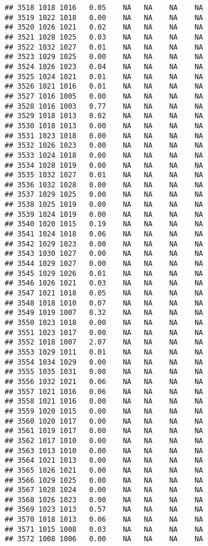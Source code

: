\documentclass{article}\usepackage{graphicx, color}
\makeatletter
\newenvironment{kframe}{%
 \def\at@end@of@kframe{}%
 \ifinner\ifhmode%
  \def\at@end@of@kframe{\end{minipage}}%
  \begin{minipage}{\columnwidth}%
 \fi\fi%
 \def\FrameCommand##1{\hskip\@totalleftmargin \hskip-\fboxsep
 \colorbox{shadecolor}{##1}\hskip-\fboxsep
     \hskip-\linewidth \hskip-\@totalleftmargin \hskip\columnwidth}%
 \MakeFramed {\advance\hsize-\width
   \@totalleftmargin\z@ \linewidth\hsize
   \@setminipage}}%
 {\par\unskip\endMakeFramed%
 \at@end@of@kframe}
\newenvironment{knitrout}{}{} %
\makeatother
\begin{document}
\begin{knitrout}
\begin{kframe}
\begin{verbatim}
## 3518 1018 1016   0.05    NA   NA    NA    NA
## 3519 1022 1018   0.00    NA   NA    NA    NA
## 3520 1026 1021   0.02    NA   NA    NA    NA
## 3521 1028 1025   0.03    NA   NA    NA    NA
## 3522 1032 1027   0.01    NA   NA    NA    NA
## 3523 1029 1025   0.00    NA   NA    NA    NA
## 3524 1026 1023   0.04    NA   NA    NA    NA
## 3525 1024 1021   0.01    NA   NA    NA    NA
## 3526 1021 1016   0.01    NA   NA    NA    NA
## 3527 1016 1005   0.00    NA   NA    NA    NA
## 3528 1016 1003   0.77    NA   NA    NA    NA
## 3529 1018 1013   0.02    NA   NA    NA    NA
## 3530 1018 1013   0.00    NA   NA    NA    NA
## 3531 1023 1018   0.00    NA   NA    NA    NA
## 3532 1026 1023   0.00    NA   NA    NA    NA
## 3533 1024 1018   0.00    NA   NA    NA    NA
## 3534 1028 1019   0.00    NA   NA    NA    NA
## 3535 1032 1027   0.01    NA   NA    NA    NA
## 3536 1032 1028   0.00    NA   NA    NA    NA
## 3537 1029 1025   0.00    NA   NA    NA    NA
## 3538 1025 1019   0.00    NA   NA    NA    NA
## 3539 1024 1019   0.00    NA   NA    NA    NA
## 3540 1020 1015   0.19    NA   NA    NA    NA
## 3541 1024 1018   0.06    NA   NA    NA    NA
## 3542 1029 1023   0.00    NA   NA    NA    NA
## 3543 1030 1027   0.00    NA   NA    NA    NA
## 3544 1029 1027   0.00    NA   NA    NA    NA
## 3545 1029 1026   0.01    NA   NA    NA    NA
## 3546 1026 1021   0.03    NA   NA    NA    NA
## 3547 1021 1018   0.05    NA   NA    NA    NA
## 3548 1018 1010   0.07    NA   NA    NA    NA
## 3549 1019 1007   0.32    NA   NA    NA    NA
## 3550 1023 1018   0.00    NA   NA    NA    NA
## 3551 1023 1017   0.00    NA   NA    NA    NA
## 3552 1018 1007   2.07    NA   NA    NA    NA
## 3553 1029 1011   0.01    NA   NA    NA    NA
## 3554 1034 1029   0.00    NA   NA    NA    NA
## 3555 1035 1031   0.00    NA   NA    NA    NA
## 3556 1032 1021   0.06    NA   NA    NA    NA
## 3557 1021 1016   0.06    NA   NA    NA    NA
## 3558 1021 1016   0.00    NA   NA    NA    NA
## 3559 1020 1015   0.00    NA   NA    NA    NA
## 3560 1020 1017   0.00    NA   NA    NA    NA
## 3561 1019 1017   0.00    NA   NA    NA    NA
## 3562 1017 1010   0.00    NA   NA    NA    NA
## 3563 1013 1010   0.00    NA   NA    NA    NA
## 3564 1021 1013   0.00    NA   NA    NA    NA
## 3565 1026 1021   0.00    NA   NA    NA    NA
## 3566 1029 1025   0.00    NA   NA    NA    NA
## 3567 1028 1024   0.00    NA   NA    NA    NA
## 3568 1026 1023   0.00    NA   NA    NA    NA
## 3569 1023 1013   0.57    NA   NA    NA    NA
## 3570 1018 1013   0.06    NA   NA    NA    NA
## 3571 1015 1008   0.03    NA   NA    NA    NA
## 3572 1008 1006   0.00    NA   NA    NA    NA

\end{verbatim}
\end{kframe}
\end{knitrout}
\end{document}
